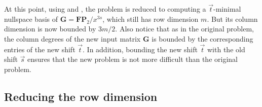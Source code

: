 At this point, using 
and , the problem is reduced
to computing a $\vec{t}$-minimal nullspace basis of $\mathbf{G}=\mathbf{F}\mathbf{P}_{2}/x^{3s}$,
which still has row dimension $m$. But its column dimension is now
bounded by $3m/2$. Also notice that as in the original problem, the
column degrees of the new input matrix $\mathbf{G}$ is bounded by
the corresponding entries of the new shift $\vec{t}$. In addition,
bounding the new shift $\vec{t}$ with the old shift $\vec{s}$ ensures
that the new problem is not more difficult than the original problem. 

\begin{comment}
Note the difference between \prettyref{lem:boundOfSumOfShiftedDegreesOfNullspaceBasis}
and \prettyref{lem:boundOnShiftedDegrees}. In \prettyref{lem:boundOfSumOfShiftedDegreesOfNullspaceBasis},
we consider only the shifted degree of a nullspace basis, where as
in \prettyref{lem:boundOnShiftedDegrees} applies to a order basis
but the order is subtracted from the degrees.
\end{comment}



\subsection{\label{sub:continueComputingNullspaceBasisByRows}Reducing the row
dimension }

